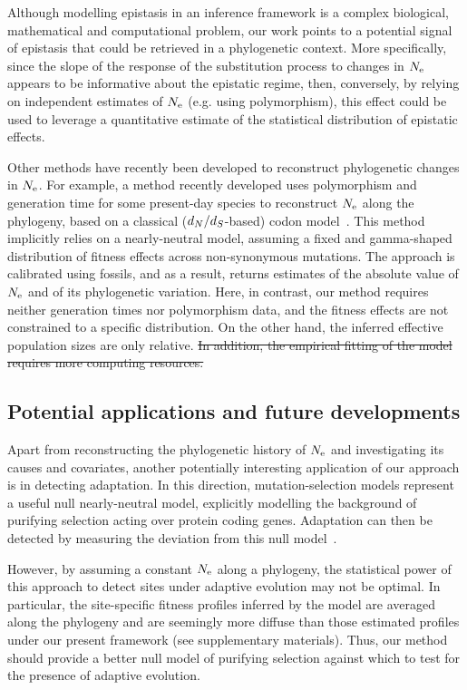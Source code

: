 \documentclass{article}
\providecommand{\DIFdeltex}[1]{{\protect\color{red}\sout{#1}}}                      %
\providecommand{\DIFdelbegin}{} %
\providecommand{\DIFdelend}{} %
\providecommand{\DIFdel}[1]{\texorpdfstring{\DIFdeltex{#1}}{}} %
\begin{document}
    Although modelling epistasis in an inference framework is a complex biological, mathematical and computational problem, our work points to a potential signal of epistasis that could be retrieved in a phylogenetic context.
    More specifically, since the slope of the response of the {substitution} process to changes in $N_{\text{e}}$ appears to be informative about the epistatic regime, then, conversely, by relying on independent estimates of $N_{\text{e}}$ (e.g. using polymorphism), this effect could be used to leverage a quantitative estimate of the statistical distribution of epistatic effects.

    Other methods have recently been developed to reconstruct phylogenetic changes in $N_{\text{e}}$.
    For example, a method recently developed uses polymorphism and generation time for some present-day species to reconstruct $N_{\text{e}}$ along the phylogeny, based on a classical ($d_N / d_S$-based) {codon} model~\citep{Brevet2019}.
    This method implicitly relies on a {nearly-neutral} model, assuming a fixed and gamma-shaped distribution of fitness effects across {non-synonymous} mutations.
    The approach is calibrated using fossils, and as a result, returns estimates of the absolute value of $N_{\text{e}}$ and of its phylogenetic variation.
    Here, in contrast, our method requires neither generation times nor polymorphism data, and the fitness effects are not constrained to a specific distribution.
    On the other hand, the inferred effective population sizes are only relative.
\DIFdelbegin \DIFdel{In addition, the empirical fitting of the model requires more computing resources.
}\DIFdelend 

    \subsection{Potential applications and future developments}

    Apart from reconstructing the phylogenetic history of $N_{\text{e}}$ and investigating its causes and covariates, another potentially interesting application of our approach is in detecting adaptation.
    In this direction, mutation-selection models represent a useful null {nearly-neutral} model, explicitly modelling the background of purifying selection acting over protein coding genes.
    Adaptation can then be detected by measuring the deviation from this null model~\citep{Rodrigue2016, Bloom2017}.

    However, by assuming a constant $N_{\text{e}}$ along a phylogeny, the statistical power of this approach to detect sites under adaptive evolution may not be optimal.
    In particular, the site-specific fitness profiles inferred by the model are averaged along the phylogeny and are seemingly more diffuse than those estimated profiles under our present framework (see supplementary materials).
    Thus, our method should provide a better null model of purifying selection against which to test for the presence of adaptive evolution.
\end{document}
